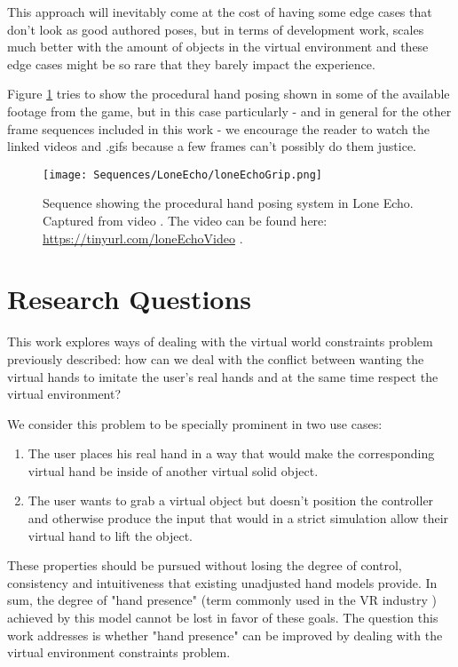 This approach will inevitably come at the cost of having some edge cases that don't look as good authored poses, but in terms of development work, scales much better with the amount of objects in the virtual environment and these edge cases might be so rare that they barely impact the experience.

Figure \ref{fig:loneEchoGrip} tries to show the procedural hand posing shown in some of the available footage from the game, but in this case particularly - and in general for the other frame sequences included in this work - we encourage the reader to watch the linked videos and .gifs because a few frames can't possibly do them justice.

\begin{figure}[H]
\centering
\texttt{[image: Sequences/LoneEcho/loneEchoGrip.png]}
\caption{Sequence showing the procedural hand posing system in Lone Echo. Captured from video \parencite{loneEchoVideo}. The video can be found here: \url{https://tinyurl.com/loneEchoVideo} .}
\label{fig:loneEchoGrip}
\end{figure}

\section{Research Questions}
\label{sec:researchQuestions}

This work explores ways of dealing with the virtual world constraints problem previously described: how can we deal with the conflict between wanting the virtual hands to imitate the user's real hands and at the same time respect the virtual environment?

We consider this problem to be specially prominent in two use cases:

\begin{enumerate}
\item The user places his real hand in a way that would make the corresponding virtual hand be inside of another virtual solid object.
\item The user wants to grab a virtual object but doesn't position the controller and otherwise produce the input that would in a strict simulation allow their virtual hand to lift the object.
\end{enumerate}

These properties should be pursued without losing the degree of control, consistency and intuitiveness that existing unadjusted hand models provide. In sum, the degree of "hand presence" (term commonly used in the VR industry \parencite{Bye2016}) achieved by this model cannot be lost in favor of these goals. The question this work addresses is whether "hand presence" can be improved by dealing with the virtual environment constraints problem.

